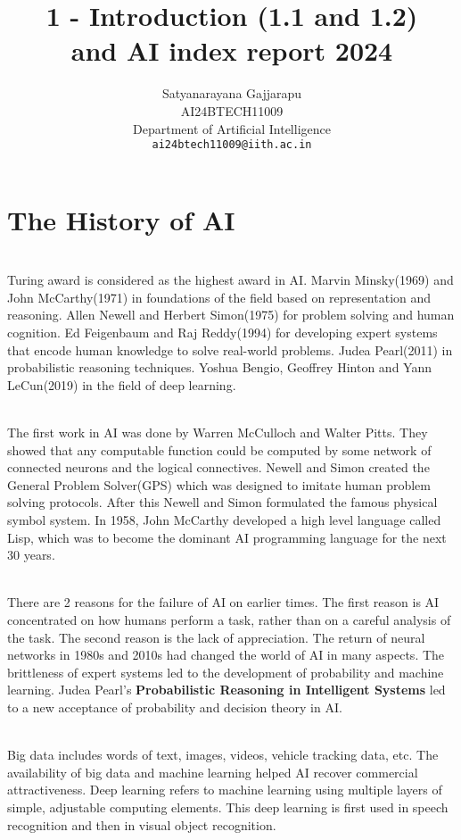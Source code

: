 \documentclass{article}
\title{1 - Introduction (1.1 and 1.2) \\ 
and AI index report 2024}
\author{%
Satyanarayana Gajjarapu \\
AI24BTECH11009 \\
Department of Artificial Intelligence \\
\texttt{ai24btech11009@iith.ac.in} \\
}
\begin{document}
\maketitle
\section{The History of AI}
\begin{paragraph}
\\
Turing award is considered as the highest award in AI. Marvin Minsky(1969) and John McCarthy(1971) in foundations of the field based on representation and reasoning. Allen Newell and Herbert Simon(1975) for problem solving and human cognition. Ed Feigenbaum and Raj Reddy(1994) for
developing expert systems that encode human knowledge to solve real-world problems. Judea Pearl(2011) in probabilistic reasoning techniques. Yoshua Bengio, Geoffrey Hinton and Yann LeCun(2019) in the field of deep learning. 
\end{paragraph}
\begin{paragraph}
\\
The first work in AI was done by Warren McCulloch and Walter Pitts. They showed that any computable function could be computed by some network of connected neurons and the logical connectives. Newell and Simon created the General Problem Solver(GPS) which was designed to imitate human problem solving protocols. After this Newell and Simon formulated the famous physical symbol system. In 1958, John McCarthy developed a high level language called Lisp, which was to become the dominant AI programming language for the next 30 years.
\end{paragraph}
\begin{paragraph}
\\
There are 2 reasons for the failure of AI on earlier times. The first reason is AI concentrated on how humans perform a task, rather than on a careful analysis of the task. The second reason is the lack of appreciation. The return of neural networks in 1980s and 2010s had changed the world of AI in many aspects. The brittleness of expert systems led to the development of probability and machine learning. Judea Pearl’s \textbf{Probabilistic Reasoning in Intelligent Systems} led to a new acceptance of probability and decision theory in AI.  
\end{paragraph}
\begin{paragraph}
\\
Big data includes words of text, images, videos, vehicle tracking data, etc. The availability of big data and machine learning helped AI recover
commercial attractiveness. Deep learning refers to machine learning using multiple layers of simple, adjustable computing elements. This deep learning is first used in speech recognition and then in visual object recognition.
\end{paragraph}
\end{document}
